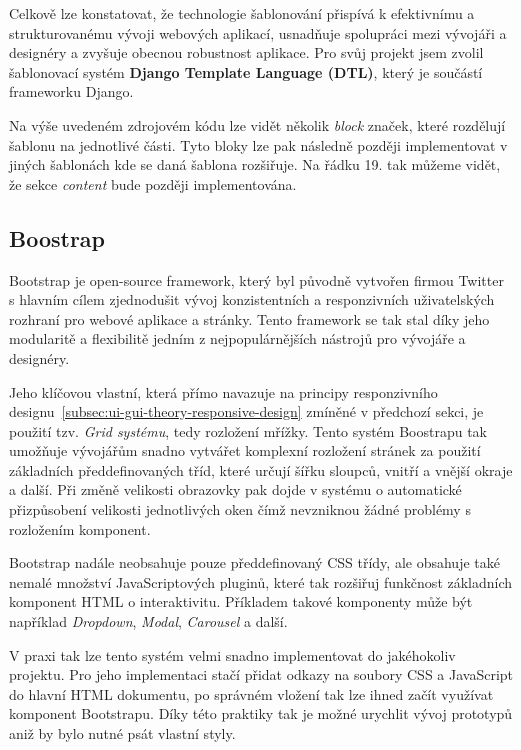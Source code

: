 Celkově lze konstatovat, že technologie šablonování přispívá k efektivnímu a strukturovanému vývoji webových aplikací, usnadňuje spolupráci mezi vývojáři a designéry a zvyšuje obecnou robustnost aplikace. Pro svůj projekt jsem zvolil šablonovací systém \textbf{Django Template Language (DTL)}, který je součástí frameworku Django.



Na výše uvedeném zdrojovém kódu lze vidět několik \textit{block} značek, které rozdělují šablonu na jednotlivé části. Tyto bloky lze pak následně později implementovat v jiných šablonách kde se daná šablona rozšiřuje. Na řádku 19. tak můžeme vidět, že sekce \textit{content} bude později implementována.

\subsection{Boostrap}
\label{subsec:dev-technology-bootstrap}
Bootstrap je open-source framework, který byl původně vytvořen firmou Twitter s hlavním cílem zjednodušit vývoj konzistentních a responzivních uživatelských rozhraní pro webové aplikace a stránky. Tento framework se tak stal díky jeho modularitě a flexibilitě jedním z nejpopulárnějších nástrojů pro vývojáře a designéry.

Jeho klíčovou vlastní, která přímo navazuje na principy responzivního designu~\ref{subsec:ui-gui-theory-responsive-design} zmíněné v předchozí sekci, je použití tzv. \textit{Grid systému}, tedy rozložení mřížky. Tento systém Boostrapu tak umožňuje vývojářům snadno vytvářet komplexní rozložení stránek za použití základních předdefinovaných tříd, které určují šířku sloupců, vnitří a vnější okraje a další. Při změně velikosti obrazovky pak dojde v systému o automatické přizpůsobení velikosti jednotlivých oken čímž nevzniknou žádné problémy s rozložením komponent.

Bootstrap nadále neobsahuje pouze předdefinovaný CSS třídy, ale obsahuje také nemalé množství JavaScriptových pluginů, které tak rozšiřuj funkčnost základních komponent HTML o interaktivitu. Příkladem takové komponenty může být například \textit{Dropdown}, \textit{Modal}, \textit{Carousel} a další.

V praxi tak lze tento systém velmi snadno implementovat do jakéhokoliv projektu. Pro jeho implementaci stačí přidat odkazy na soubory CSS a JavaScript do hlavní HTML dokumentu, po správném vložení tak lze ihned začít využívat komponent Bootstrapu. Díky této praktiky tak je možné urychlit vývoj prototypů aniž by bylo nutné psát vlastní styly.

\endinput